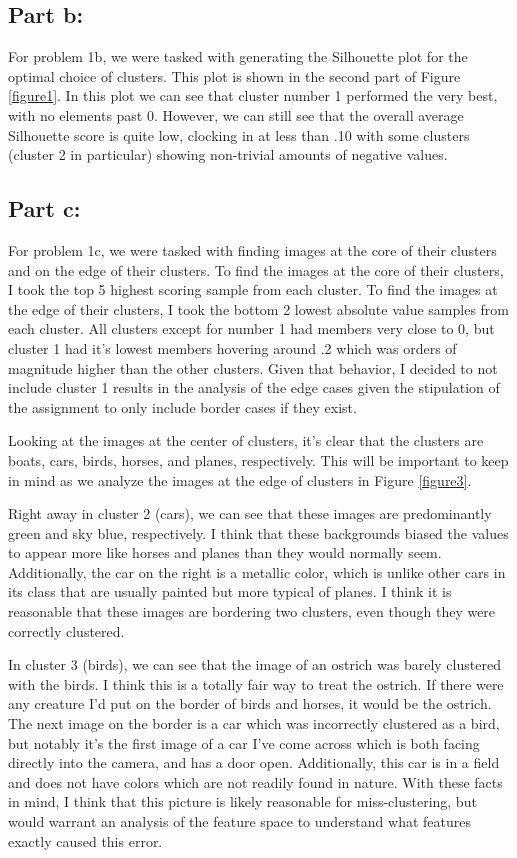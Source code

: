 \documentclass[12pt]{article}
\begin{document}
\subsection{Part b:}
For problem 1b, we were tasked with generating the Silhouette plot for the optimal choice of clusters. This plot is 
shown in the second part of Figure \ref{figure1}. In this plot we can see that cluster number 1 performed the very 
best, with no elements past 0. However, we can still see that the overall average Silhouette score is quite low, 
clocking in at less than .10 with  some clusters (cluster 2 in particular) showing non-trivial amounts of negative
values.

\subsection{Part c:}
For problem 1c, we were tasked with finding images at the core of their clusters and on the edge of their clusters.
To find the images at the core of their clusters, I took the top 5 highest scoring sample from each cluster. To find
the images at the edge of their clusters, I took the bottom 2 lowest absolute value samples from each cluster. All clusters
except for number 1 had members very close to 0, but cluster 1 had it's lowest members hovering around .2 which was orders
of magnitude higher than the other clusters. Given that behavior, I decided to not include cluster 1 results in the analysis 
of the edge cases given the stipulation of the assignment to only include border cases if they exist.

Looking at the images at the center of clusters, it's clear that the clusters are boats, cars, birds, horses, and planes, 
respectively. This will be important to keep in mind as we analyze the images at the edge of clusters in Figure \ref{figure3}.


Right away in cluster 2 (cars), we can see that these images are predominantly green and sky blue, respectively. I think that these
backgrounds biased the values to appear more like horses and planes than they would normally seem. Additionally, the car
on the right is a metallic color, which is unlike other cars in its class that are usually painted but more typical of 
planes. I think it is reasonable that these images are bordering two clusters, even though they were correctly clustered.

In cluster 3 (birds), we can see that the image of an ostrich was barely clustered with the birds. I think this is a 
totally fair way to treat the ostrich. If there were any creature I'd put on the border of birds and horses, it would be 
the ostrich. The next image on the border is a car which was incorrectly clustered as a bird, but notably it's the first 
image of a car I've come across which is both facing directly into the camera, and has a door open. Additionally, this 
car is in a field and does not have colors which are not readily found in nature. With these facts in mind, I think that 
this picture is likely reasonable for miss-clustering, but would warrant an analysis of the feature space to understand
what features exactly caused this error.
\end{document}
